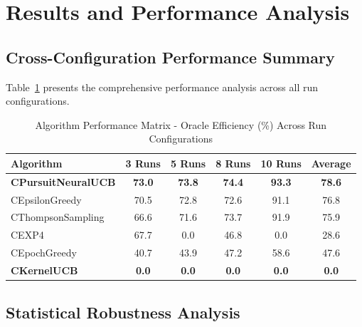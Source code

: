 \documentclass[12pt,a4paper]{article}
\newcommand{\primarytext}[1]{\textcolor{primaryblue}{\textbf{#1}}}
\newcommand{\warning}[1]{\textcolor{warningred}{\textbf{#1}}}
\begin{document}
\section{Results and Performance Analysis}

\begin{tcolorbox}[colback=tableheader,colframe=primaryblue,title=\textbf{Primary Performance Results}]

\subsection{Cross-Configuration Performance Summary}

Table~\ref{tab:performance_matrix} presents the comprehensive performance analysis across all run configurations.

\begin{table}[H]
\centering
\caption{Algorithm Performance Matrix - Oracle Efficiency (\%) Across Run Configurations}
\label{tab:performance_matrix}
\begin{tabular}{@{}lccccc@{}}
\toprule
\textbf{Algorithm} & \textbf{3 Runs} & \textbf{5 Runs} & \textbf{8 Runs} & \textbf{10 Runs} & \textbf{Average} \\
\midrule
\primarytext{CPursuitNeuralUCB} & \primarytext{73.0} & \primarytext{73.8} & \primarytext{74.4} & \primarytext{93.3} & \primarytext{78.6} \\
CEpsilonGreedy & 70.5 & 72.8 & 72.6 & 91.1 & 76.8 \\
CThompsonSampling & 66.6 & 71.6 & 73.7 & 91.9 & 75.9 \\
CEXP4 & 67.7 & 0.0 & 46.8 & 0.0 & 28.6 \\
CEpochGreedy & 40.7 & 43.9 & 47.2 & 58.6 & 47.6 \\
\warning{CKernelUCB} & \warning{0.0} & \warning{0.0} & \warning{0.0} & \warning{0.0} & \warning{0.0} \\
\bottomrule
\end{tabular}
\end{table}

\end{tcolorbox}

\subsection{Statistical Robustness Analysis}
\end{document}
